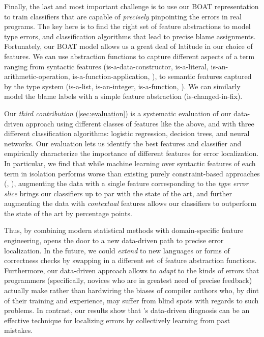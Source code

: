 %
Finally, the last and most important challenge is to
use our BOAT representation to train classifiers that
are capable of \emph{precisely} pinpointing the errors
in real programs.
%
The key here is to find the right set of feature
abstractions to model type errors,
and classification algorithms that
lead to precise blame assignments.
%
Fortunately, our BOAT model allows us a great deal of
latitude in our choice of features.
%
We can use abstraction functions to capture different
aspects of a term ranging from
%
syntactic features (\eg is-a-data-constructor, is-a-literal,
is-an-arithmetic-operation, is-a-function-application, \etc),
%
to semantic features captured by the type system (\eg is-a-list,
is-an-integer, is-a-function, \etc).
%
We can similarly model the blame labels with a simple feature
abstraction (\eg is-changed-in-fix).

Our \emph{third contribution} (\autoref{sec:evaluation})
is a systematic evaluation of our data-driven approach
using different classes of features like the above, and
with three different classification algorithms: logistic
regression, decision trees, and neural networks.
%
Our evaluation lets us identify the best features and
classifier and empirically characterize the importance
of different features for error localization.
%
In particular, we find that while machine learning
over syntactic features of each term in isolation
performs worse than existing
purely constraint-based approaches (\eg \ocaml, \sherrloc),
augmenting the data with a single feature corresponding to
the \emph{type error slice} \citep{Tip2001-qp} brings our
classifiers up to par with the state of the art,
and further augmenting the data with \emph{contextual}
features allows our classifiers to outperform
the state of the art by \ToolnameWinSherrloc percentage points.

Thus, by combining modern statistical methods
with domain-specific feature engineering, \toolname
opens the door to a new data-driven path to
precise error localization.
%
In the future, we could \emph{extend}
\toolname to new languages or forms
of correctness checks by swapping in
a different set of feature abstraction
functions.
%
Furthermore, our data-driven approach
allows \toolname to \emph{adapt} to
the kinds of errors that programmers
(specifically, novices who are in greatest
need of precise feedback) actually make
rather than hardwiring the biases of
compiler authors who, by dint of their
training and experience, may suffer from
blind spots with regards to such problems.
%
In contrast, our results show that \toolname's
data-driven diagnosis can be an effective
technique for localizing errors by collectively
learning from past mistakes.

